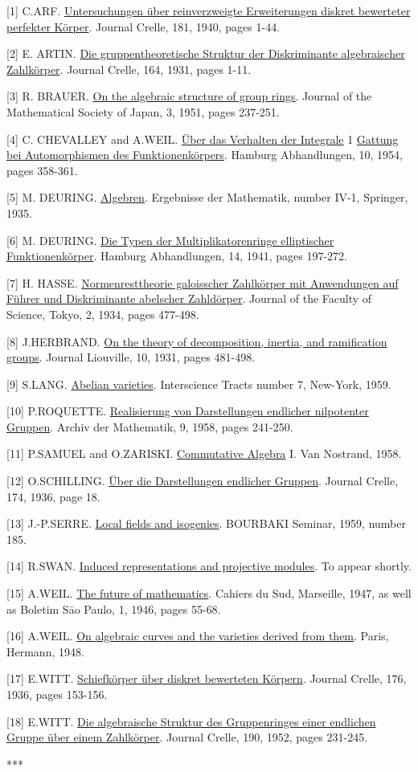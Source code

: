 \begin{center}\end{center}

[1] C.ARF. \uline{Untersuchungen über reinverzweigte Erweiterungen diskret bewerteter perfekter Körper}. Journal Crelle, 181, 1940, pages 1-44.

[2] E. ARTIN. \uline{Die gruppentheoretische Struktur der Diskriminante algebraischer Zahlkörper}. Journal Crelle, 164, 1931, pages 1-11.

[3] R. BRAUER. \uline{On the algebraic structure of group rings}. Journal of the Mathematical Society of Japan, 3, 1951, pages 237-251.

[4] C. CHEVALLEY and A.WEIL. \uline{Über das Verhalten der Integrale} 1 \uline{Gattung bei Automorphismen des Funktionenkörpers}. Hamburg Abhandlungen, 10, 1954, pages 358-361.

[5] M. DEURING. \uline{Algebren}. Ergebnisse der Mathematik, number IV-1, Springer, 1935.

[6] M. DEURING. \uline{Die Typen der Multiplikatorenringe elliptischer Funktionenkörper}. Hamburg Abhandlungen, 14, 1941, pages 197-272.

[7] H. HASSE. \uline{Normenresttheorie galoisscher Zahlkörper mit Anwendungen auf Führer und Diskriminante abelscher Zahldörper}. Journal of the Faculty of Science, Tokyo, 2, 1934, pages 477-498.

[8] J.HERBRAND. \uline{On the theory of decomposition, inertia, and ramification groups}. Journal Liouville, 10, 1931, pages 481-498.

[9] S.LANG. \uline{Abelian varieties}. Interscience Tracts number 7, New-York, 1959.

[10] P.ROQUETTE. \uline{Realisierung von Darstellungen endlicher nilpotenter Gruppen}. Archiv der Mathematik, 9, 1958, pages 241-250.

[11] P.SAMUEL and O.ZARISKI. \uline{Commutative Algebra} I. Van Nostrand, 1958.

[12] O.SCHILLING. \uline{Über die Darstellungen endlicher Gruppen}. Journal Crelle, 174, 1936, page 18.

[13] J.-P.SERRE. \uline{Local fields and isogenies}. BOURBAKI Seminar, 1959, number 185.

[14] R.SWAN. \uline{Induced representations and projective modules}. To appear shortly.

[15] A.WEIL. \uline{The future of mathematics}. Cahiers du Sud, Marseille, 1947, as well as Boletim S\={a}o Paulo, 1, 1946, pages 55-68.

[16] A.WEIL. \uline{On algebraic curves and the varieties derived from them}. Paris, Hermann, 1948.

[17] E.WITT. \uline{Schiefkörper über diskret bewerteten Körpern}. Journal Crelle, 176, 1936, pages 153-156.

[18] E.WITT. \uline{Die algebraische Struktur des Gruppenringes einer endlichen Gruppe über einem Zahlkörper}. Journal Crelle, 190, 1952, pages 231-245.

\begin{center}***\end{center}
